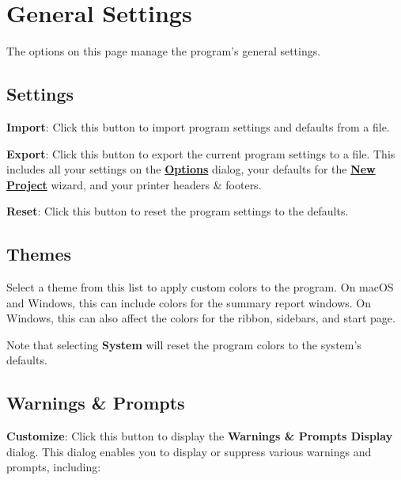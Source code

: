 \documentclass[
]{book}
\theoremstyle{definition}
\theoremstyle{definition}
\theoremstyle{definition}
\theoremstyle{definition}
\theoremstyle{remark}
\begin{document}
\hypertarget{options-general-settings}{%
\section{General Settings}\label{options-general-settings}}

The options on this page manage the program's general settings.

\hypertarget{settings}{%
\subsection*{Settings}\label{settings}}

\textbf{Import}: Click this button to import program settings and defaults from a file.

\textbf{Export}: Click this button to export the current program settings to a file. This includes all your settings on the \protect\hyperlink{options-overview}{\textbf{Options}} dialog, your defaults for the \protect\hyperlink{creating-standard-project}{\textbf{New Project}} wizard, and your printer headers \& footers.

\textbf{Reset}: Click this button to reset the program settings to the defaults.

\hypertarget{themes}{%
\subsection*{Themes}\label{themes}}

Select a theme from this list to apply custom colors to the program. On macOS and Windows, this can include colors for the summary report windows. On Windows, this can also affect the colors for the ribbon, sidebars, and start page.

Note that selecting \textbf{System} will reset the program colors to the system's defaults.

\hypertarget{WarningsDisplay}{%
\subsection*{Warnings \& Prompts}\label{WarningsDisplay}}

\textbf{Customize}: Click this button to display the \textbf{Warnings \& Prompts Display} dialog. This dialog enables you to display or suppress various warnings and prompts, including:
\end{document}
